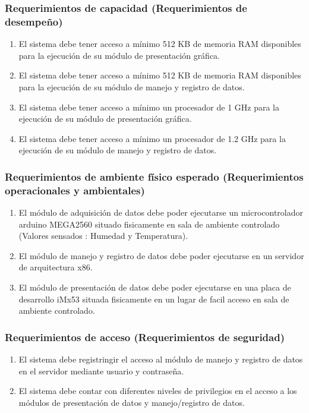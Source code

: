 \subsubsection{\textcolor[gray]{.2}{Requerimientos de capacidad (Requerimientos de
desempeño)}}
\begin{enumerate}
\item El sistema debe tener acceso a mínimo 512 KB de memoria RAM disponibles
para la ejecución de su módulo de presentación gráfica.
\item El sistema debe tener acceso a mínimo 512 KB de memoria RAM disponibles
para la ejecución de su módulo de manejo y registro de datos.
\item El sistema debe tener acceso a mínimo un procesador de 1 GHz para la
ejecución de su módulo de presentación gráfica.
\item El sistema debe tener acceso a mínimo un procesador de 1.2 GHz para la
ejecución de su módulo de manejo y registro de datos.
\end{enumerate}
 
\subsubsection{\textcolor[gray]{.2}{Requerimientos de ambiente físico esperado
(Requerimientos operacionales y ambientales)}}
\begin{enumerate}
\item El módulo de adquisición de datos debe poder ejecutarse un
microcontrolador arduino MEGA2560 situado fisicamente en sala de ambiente
controlado (Valores sensados : Humedad y Temperatura).
\item El módulo de manejo y registro de datos debe poder ejecutarse en un
servidor de arquitectura x86.
\item El módulo de presentación de datos debe poder ejecutarse en una placa de
desarrollo iMx53 situada fisicamente en un lugar de facil acceso en sala de
ambiente controlado.
\end{enumerate}

\subsubsection{\textcolor[gray]{.2}{Requerimientos de acceso (Requerimientos de
seguridad)}}
\begin{enumerate}
\item El sistema debe registringir el acceso al módulo de manejo y registro de
datos en el servidor mediante usuario y contraseña. 
\item El sistema debe contar con diferentes niveles de privilegios en el acceso
a los módulos de presentación de datos y manejo/registro de datos.
\end{enumerate}

